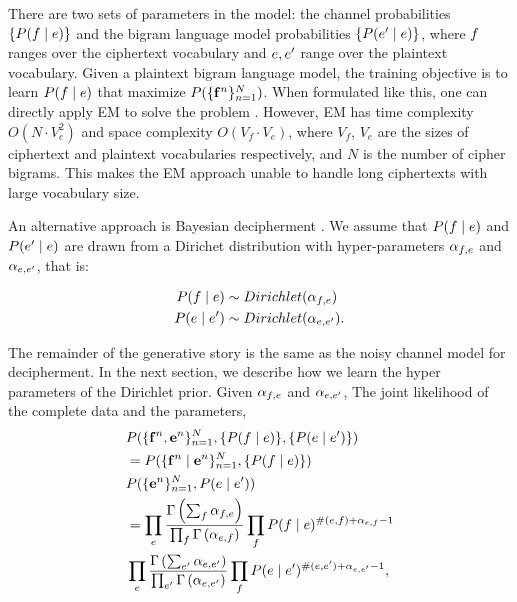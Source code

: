 There are two sets of parameters in the model: the channel probabilities $\{ P(f \mid e) \} $ and the bigram language model probabilities $\{ P(e' \mid e) \} $, where $f$ ranges over the ciphertext vocabulary and $e,e'$ range over the plaintext vocabulary. Given a plaintext bigram language model, the training objective is to learn $P(f \mid e)$ that maximize $P( \{ \mathbf{f}^n \}_{n=1}^{N} )$. When formulated like this, one can directly apply EM to solve the problem \cite{knight-EtAl:2006}. However, EM has time complexity $O( N\cdot V_{e}^{2})$ and space complexity $O(V_{f}\cdot V_{e})$, where $V_{f}$, $V_{e}$ are the sizes of ciphertext and plaintext vocabularies respectively, and $N$ is the number of cipher bigrams. This makes the EM approach unable to handle long ciphertexts with large vocabulary size. 

An alternative approach is Bayesian decipherment \cite{ravi-knight:2011}. We assume that $P(f \mid e)$ and $P(e' \mid e)$ are drawn from a Dirichet distribution with hyper-parameters $\alpha_{f,e}$ and $\alpha_{e,e'}$, that is: 

\begin{align*}
P(f \mid e) & \sim Dirichlet(\alpha_{f,e}) \\ 
P(e \mid e') & \sim Dirichlet(\alpha_{e,e'}).
\end{align*}

The remainder of the generative story is the same as the noisy channel model for decipherment. In the next section, we describe how we learn the hyper parameters of the Dirichlet prior. Given $\alpha_{f,e}$ and $\alpha_{e,e'}$, The joint likelihood of the complete data and the parameters,
\begin{align} \label{joint_likelihood}
&P( \{ \mathbf{f}^n , \mathbf{e}^n \}_{n=1}^{N}, \{ P(f \mid e) \}, \{ P(e \mid e') \} )  \notag \\
 &= P( \{ \mathbf{f}^n \mid \mathbf{e}^n \}_{n=1}^{N}, \{ P(f \mid e) \}) \notag \\
     &P(  \{  \mathbf{e}^n \}_{n=1}^{N},P(e \mid e')) \notag \notag \\
 &= \prod_{e}  \frac{\Gamma \left( \sum_{f} \alpha_{f,e} \right)} {\prod_{f} \Gamma \left( \alpha_{e,f} \right)} \prod_{f} P(f \mid e)^{\#(e,f)+\alpha_{e,f} -1}  \notag \\
  &\prod_{e}  \frac{\Gamma \left( \sum_{e'} \alpha_{e,e'} \right)} {\prod_{e'} \Gamma \left( \alpha_{e,e'} \right)} \prod_{f} P(e \mid e')^{\#(e,e')+\alpha_{e,e'} -1} , 
\end{align}


